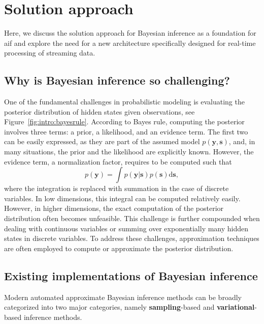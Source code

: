 \section{Solution approach}\label{chapter-01:section:discussion}

Here, we discuss the solution approach for Bayesian inference as a foundation for \ac{aif} and explore the need for a new architecture specifically designed for real-time processing of streaming data.


\subsection{Why is Bayesian inference so challenging?}

One of the fundamental challenges in probabilistic modeling is evaluating the posterior distribution of hidden states given observations, see Figure~\ref{fig:intro:bayesrule}. 
According to Bayes rule, computing the posterior involves three terms: a prior, a likelihood, and an evidence term. 
The first two can be easily expressed, as they are part of the assumed model $p(\bm{y}, \bm{s})$, and, in many situations, the prior and the likelihood are explicitly known. 
However, the evidence term, a normalization factor, requires to be computed such that 
\begin{equation}
    p(\bm{y}) = \int p(\bm{y}\vert\bm{s})p(\bm{s})\mathrm{d}\bm{s},
\end{equation}
where the integration is replaced with summation in the case of discrete variables.
In low dimensions, this integral can be computed relatively easily. However, in higher dimensions, the exact computation of the posterior distribution often becomes unfeasible. This challenge is further compounded when dealing with continuous variables or summing over exponentially many hidden states in discrete variables. To address these challenges, approximation techniques are often employed to compute or approximate the posterior distribution.

\subsection{Existing implementations of Bayesian inference}

Modern automated approximate Bayesian inference methods can be broadly categorized into two major categories, namely \textbf{sampling}-based and \textbf{variational}-based inference methods. 

